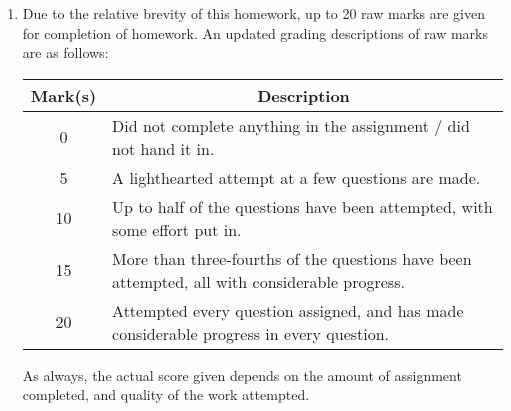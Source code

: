 \documentclass{amsart}
\theoremstyle{definition}
\theoremstyle{definition}
\DeclareMathOperator{\1}{\mathbbm{1}}
\begin{document}
	
	\begin{enumerate}[itemsep=.75em]
		
		
		\item Due to the relative brevity of this homework, up to 20 raw marks are given for completion of homework. An updated grading descriptions of raw marks are as follows:
		
		\begin{center}
			\begin{tabular}{c | p{9cm}}
				\textbf{Mark(s)} & \multicolumn{1}{c}{\textbf{Description}} \\
				\hline
				0 & Did not complete anything in the assignment / did not hand it in. \\
				\hline
				5 & A lighthearted attempt at a few questions are made. \\
				\hline
				10 & Up to half of the questions have been attempted, with some effort put in. \\
				\hline
				15 & More than three-fourths of the questions have been attempted, all with considerable progress. \\
				\hline
				20 & Attempted every question assigned, and has made considerable progress in every question.
			\end{tabular}
		\end{center}
	
		\noindent As always, the actual score given depends on the amount of assignment completed, and quality of the work attempted.
		
		

\end{enumerate}
\end{document}
